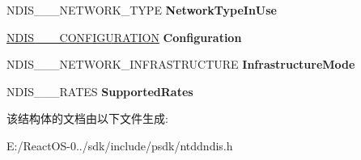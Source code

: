 \begin{DoxyCompactItemize}
N\+D\+I\+S\+\_\+\_\+\_\+\+N\+E\+T\+W\+O\+R\+K\+\_\+\+T\+Y\+PE {\bfseries Network\+Type\+In\+Use}
\item 
\mbox{\label{struct___n_d_i_s___w_l_a_n___b_s_s_i_d_a5ec16d498238edec1652d7524a83aab0}} 
\hyperlink{struct___n_d_i_s__802__11___c_o_n_f_i_g_u_r_a_t_i_o_n}{N\+D\+I\+S\+\_\+\_\+\_\+\+C\+O\+N\+F\+I\+G\+U\+R\+A\+T\+I\+ON} {\bfseries Configuration}
\item 
\mbox{\label{struct___n_d_i_s___w_l_a_n___b_s_s_i_d_afbae12aa30fa976649d932e74b7b2640}} 
N\+D\+I\+S\+\_\+\_\+\_\+\+N\+E\+T\+W\+O\+R\+K\+\_\+\+I\+N\+F\+R\+A\+S\+T\+R\+U\+C\+T\+U\+RE {\bfseries Infrastructure\+Mode}
\item 
\mbox{\label{struct___n_d_i_s___w_l_a_n___b_s_s_i_d_a45e90154965a31b7decf968da7ec2df9}} 
N\+D\+I\+S\+\_\+\_\+\_\+\+R\+A\+T\+ES {\bfseries Supported\+Rates}
\end{DoxyCompactItemize}


该结构体的文档由以下文件生成\+:\begin{DoxyCompactItemize}
\item 
E\+:/\+React\+O\+S-\/0../sdk/include/psdk/ntddndis.\+h\end{DoxyCompactItemize}
